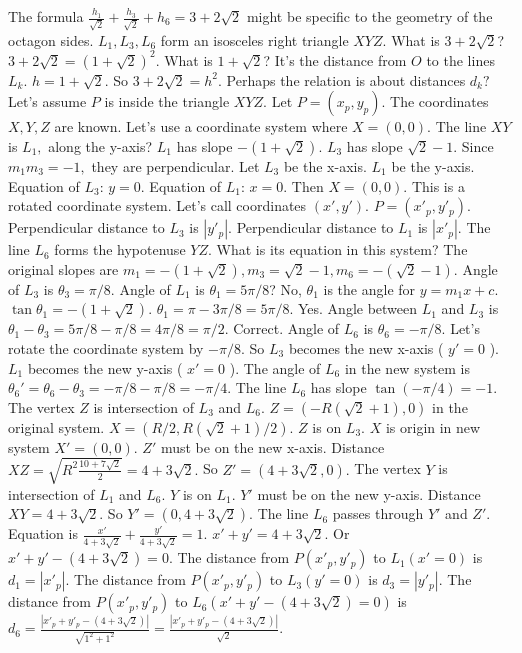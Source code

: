 The formula $\frac{h_1}{\sqrt{2}} + \frac{h_3}{\sqrt{2}} + h_6 = 3+2\sqrt{2}$ might be specific to the geometry of the octagon sides. $L_1, L_3, L_6$ form an isosceles right triangle $XYZ.$ 
What is $3+2\sqrt{2}$? $3+2\sqrt{2} = (1+\sqrt{2})^2.$ What is $1+\sqrt{2}$? It's the distance from $O$ to the lines $L_k.$ $h=1+\sqrt{2}.$ So $3+2\sqrt{2}=h^2.$ 
Perhaps the relation is about distances $d_k?$ 
Let's assume $P$ is inside the triangle $XYZ.$ Let $P=(x_p, y_p).$ The coordinates $X, Y, Z$ are known. Let's use a coordinate system where $X=(0,0).$ The line $XY$ is $L_1,$ along the y-axis? $L_1$ has slope $-(1+\sqrt{2}).$ $L_3$ has slope $\sqrt{2}-1.$ Since $m_1 m_3 = -1,$ they are perpendicular. Let $L_3$ be the x-axis. $L_1$ be the y-axis. 
Equation of $L_3$: $y=0.$ Equation of $L_1$: $x=0.$ Then $X=(0,0).$ 
This is a rotated coordinate system. Let's call coordinates $(x', y').$ 
$P=(x'_p, y'_p).$ Perpendicular distance to $L_3$ is $|y'_p|.$ Perpendicular distance to $L_1$ is $|x'_p|.$ 
The line $L_6$ forms the hypotenuse $YZ.$ What is its equation in this system? 
The original slopes are $m_1=-(1+\sqrt{2}), m_3=\sqrt{2}-1, m_6=-(\sqrt{2}-1).$ 
Angle of $L_3$ is $\theta_3 = \pi/8.$ Angle of $L_1$ is $\theta_1 = 5\pi/8$? No, $\theta_1$ is the angle for $y=m_1 x + c.$ $\tan \theta_1 = -(1+\sqrt{2}).$ $\theta_1 = \pi - 3\pi/8 = 5\pi/8.$ Yes. Angle between $L_1$ and $L_3$ is $\theta_1-\theta_3 = 5\pi/8 - \pi/8 = 4\pi/8 = \pi/2.$ Correct. 
Angle of $L_6$ is $\theta_6 = -\pi/8.$ 
Let's rotate the coordinate system by $-\pi/8.$ So $L_3$ becomes the new x-axis ( $y'=0$ ). $L_1$ becomes the new y-axis ( $x'=0$ ). 
The angle of $L_6$ in the new system is $\theta_6' = \theta_6 - \theta_3 = -\pi/8 - \pi/8 = -\pi/4.$ 
The line $L_6$ has slope $\tan(-\pi/4) = -1.$ 
The vertex $Z$ is intersection of $L_3$ and $L_6.$ $Z = (-R(\sqrt{2}+1), 0)$ in the original system. $X = (R/2, R(\sqrt{2}+1)/2).$ 
$Z$ is on $L_3.$ $X$ is origin in new system $X'=(0,0).$ $Z'$ must be on the new x-axis. Distance $XZ = \sqrt{R^2 \frac{10+7\sqrt{2}}{2}} = 4+3\sqrt{2}.$ So $Z' = (4+3\sqrt{2}, 0).$ 
The vertex $Y$ is intersection of $L_1$ and $L_6.$ $Y$ is on $L_1.$ $Y'$ must be on the new y-axis. Distance $XY = 4+3\sqrt{2}.$ So $Y' = (0, 4+3\sqrt{2}).$ 
The line $L_6$ passes through $Y'$ and $Z'.$ Equation is $\frac{x'}{4+3\sqrt{2}} + \frac{y'}{4+3\sqrt{2}} = 1.$ $x'+y' = 4+3\sqrt{2}.$ Or $x'+y'-(4+3\sqrt{2})=0.$ 
The distance from $P(x'_p, y'_p)$ to $L_1 (x'=0)$ is $d_1 = |x'_p|.$ 
The distance from $P(x'_p, y'_p)$ to $L_3 (y'=0)$ is $d_3 = |y'_p|.$ 
The distance from $P(x'_p, y'_p)$ to $L_6 (x'+y'-(4+3\sqrt{2})=0)$ is $d_6 = \frac{|x'_p+y'_p-(4+3\sqrt{2})|}{\sqrt{1^2+1^2}} = \frac{|x'_p+y'_p-(4+3\sqrt{2})|}{\sqrt{2}}.$

